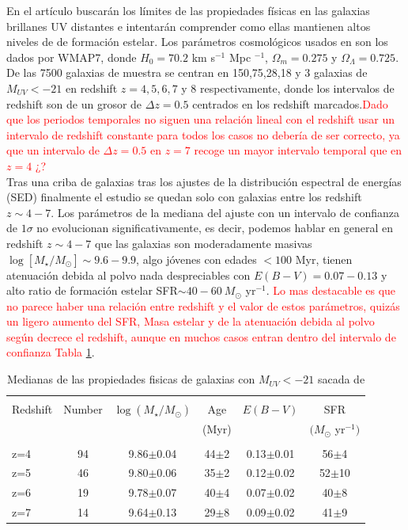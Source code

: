 \documentclass{article}
\begin{document}
En el artículo buscarán los límites de las propiedades físicas en las galaxias brillanes UV distantes e intentarán comprender como ellas mantienen altos niveles de de formación estelar. Los parámetros cosmológicos usados en \cite{finkelstein2015increasing} son los dados por WMAP7, donde $H_0=70.2$ km s$^{-1}$ Mpc $^{-1}$, $\Omega_m=0.275$ y $\Omega_\Lambda=0.725$. De las 7500 galaxias de muestra se centran en 150,75,28,18 y 3 galaxias de $M_{UV}<-21$ en redshift $z=4,5,6,7$ y 8 respectivamente, donde los intervalos de redshift son de un grosor de $\Delta z=0.5$ centrados en los redshift marcados.\textcolor{red}{Dado que los periodos temporales no siguen una relación lineal con el redshift usar un intervalo de redshift constante para todos los casos no debería de ser correcto, ya que un intervalo de $\Delta z=0.5$ en $z=7$ recoge un mayor intervalo temporal que en $z=4$ ¿?}\\

Tras una criba de galaxias tras los ajustes de la distribución espectral de energías (SED) finalmente el estudio se quedan solo con galaxias entre los redshift $z\sim 4-7$. Los parámetros de la mediana del ajuste con un intervalo de confianza de $1\sigma$ no evolucionan significativamente, es decir, podemos hablar en general en redshift $z\sim 4-7$ que las galaxias son moderadamente masivas $\log[M_\star/M_\odot]\sim 9.6-9.9$, algo jóvenes con edades $<100$ Myr, tienen atenuación debida al polvo nada despreciables con $E(B-V)=0.07-0.13$ y alto ratio de formación estelar SFR$\sim 40-60\ M_\odot$ yr$^{-1}$. \textcolor{red}{Lo mas destacable es que no parece haber una relación entre redshift y el valor de estos parámetros, quizás un ligero aumento del SFR, Masa estelar y de la atenuación debida al polvo según decrece el redshift, aunque en muchos casos entran dentro del intervalo de confianza Tabla \ref{tab:finkelstein1}}.\\

\begin{table}[h]
\begin{center}
\begin{tabular}{lccccc}
\hline \hline\\
Redshift & Number & $\log(M_\star/M_\odot)$ & Age & $E(B-V)$ & SFR\\
	&	&	&	(Myr)	&	& $(M_\odot$ yr$^{-1})$\\
\hline\\
z=4 & 94 & 9.86$\pm$0.04 & 44$\pm$2 & 0.13$\pm$0.01 & 56$\pm$4\\
z=5 & 46 & 9.80$\pm$0.06 & 35$\pm$2 & 0.12$\pm$0.02 & 52$\pm$10\\
z=6 & 19 & 9.78$\pm$0.07 & 40$\pm$4 & 0.07$\pm$0.02 & 40$\pm$8\\
z=7 & 14 & 9.64$\pm$0.13 & 29$\pm$8 & 0.09$\pm$0.02 & 41$\pm$9\\
\hline
\end{tabular}
\caption{\label{tab:finkelstein1} Medianas de las propiedades fisicas de galaxias con $M_{UV}<-21$ sacada de \cite{finkelstein2015increasing}}
\end{center}
\end{table}
\end{document}

